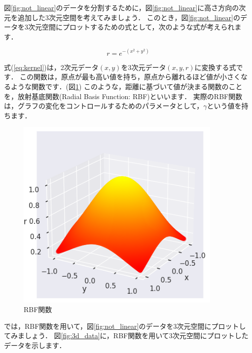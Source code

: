 \documentclass{jarticle}
\begin{document}
図\ref{fig:not_linear}のデータを分割するために，図\ref{fig:not_linear}に高さ方向の次元を追加した3次元空間を考えてみましょう．
このとき，図\ref{fig:not_linear}のデータを3次元空間にプロットするための式として，次のような式が考えられます．

\begin{equation}\label{eq:kernel}
  r = e^{-(x^2 + y^2)}
\end{equation}

式(\ref{eq:kernel})は，2次元データ$(x, y)$を3次元データ$(x, y, r)$に変換する式です．
この関数は，原点が最も高い値を持ち，原点から離れるほど値が小さくなるような関数です．(図\ref{fig:RBF})
このような，距離に基づいて値が決まる関数のことを，放射基底関数(Radial Basis Function: RBF)といいます．
実際のRBF関数は，グラフの変化をコントロールするためのパラメータとして，$\gamma $という値を持ちます．

\begin{figure}[H]
  \centering
  \includegraphics[width=10cm]{fig/RBF_function.png}
  \caption{RBF関数}
  \label{fig:RBF}
\end{figure}

では，RBF関数を用いて，図\ref{fig:not_linear}のデータを3次元空間にプロットしてみましょう．
図\ref{fig:3d_data}に，RBF関数を用いて3次元空間にプロットしたデータを示します．
\end{document}
